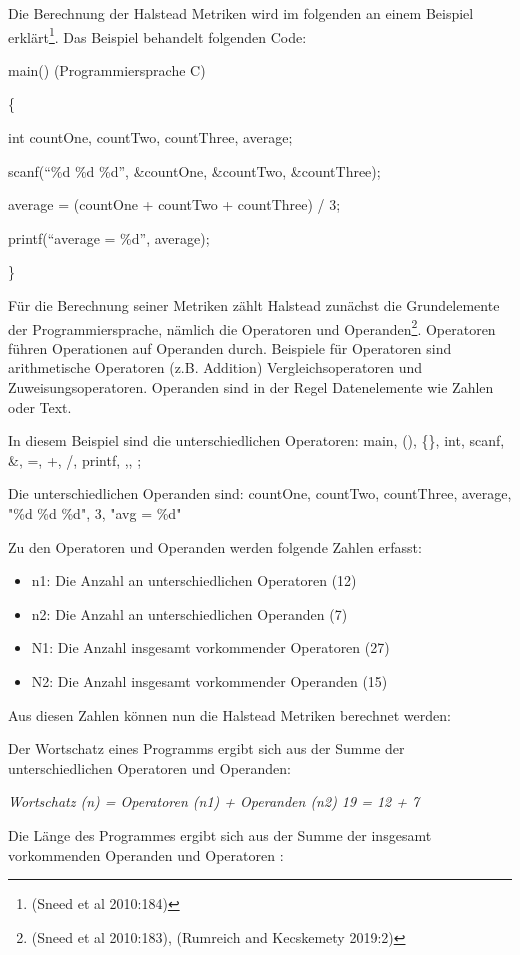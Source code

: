 Die Berechnung der Halstead Metriken wird im folgenden an einem Beispiel
erklärt\footnote{(Sneed et al 2010:184)}. Das Beispiel behandelt
folgenden Code:

main() (Programmiersprache C)

\{

int countOne, countTwo, countThree, average;

scanf(``\%d \%d \%d'', \&countOne, \&countTwo, \&countThree);

average = (countOne + countTwo + countThree) / 3;

printf(``average = \%d'', average);

\}

Für die Berechnung seiner Metriken zählt Halstead zunächst die
Grundelemente der Programmiersprache, nämlich die Operatoren und
Operanden\footnote{(Sneed et al 2010:183), (Rumreich and Kecskemety
  2019:2)}. Operatoren führen Operationen auf Operanden durch. Beispiele
für Operatoren sind arithmetische Operatoren (z.B. Addition)
Vergleichsoperatoren und Zuweisungsoperatoren. Operanden sind in der
Regel Datenelemente wie Zahlen oder Text.

In diesem Beispiel sind die unterschiedlichen Operatoren: main, (),
\{\}, int, scanf, \&, =, +, /, printf, ,, ;

Die unterschiedlichen Operanden sind: countOne, countTwo, countThree,
average, "\%d \%d \%d", 3, "avg = \%d"

Zu den Operatoren und Operanden werden folgende Zahlen erfasst:

\begin{itemize}
\item
  n1: Die Anzahl an unterschiedlichen Operatoren (12)
\item
  n2: Die Anzahl an unterschiedlichen Operanden (7)
\item
  N1: Die Anzahl insgesamt vorkommender Operatoren (27)
\item
  N2: Die Anzahl insgesamt vorkommender Operanden (15)
\end{itemize}

Aus diesen Zahlen können nun die Halstead Metriken berechnet werden:

Der Wortschatz eines Programms ergibt sich aus der Summe der
unterschiedlichen Operatoren und Operanden:

\emph{Wortschatz (n) = Operatoren (n1) + Operanden (n2) 19 = 12 + 7}

Die Länge des Programmes ergibt sich aus der Summe der insgesamt
vorkommenden Operanden und Operatoren :

